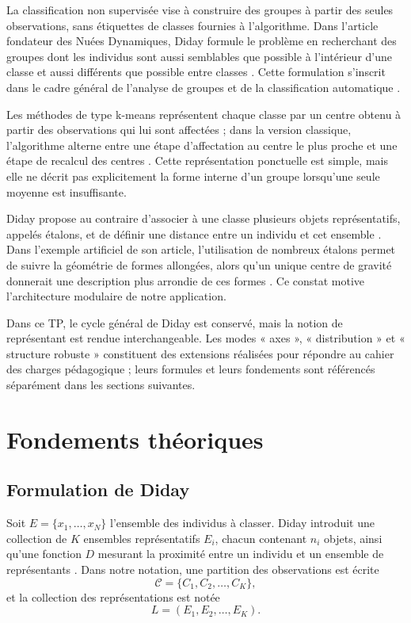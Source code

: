 \documentclass[12pt,a4paper]{article}
\begin{document}
La classification non supervisée vise à construire des groupes à partir des seules observations, sans étiquettes de classes fournies à l'algorithme. Dans l'article fondateur des Nuées Dynamiques, Diday formule le problème en recherchant des groupes dont les individus sont aussi semblables que possible à l'intérieur d'une classe et aussi différents que possible entre classes \cite[p.~20]{diday1971}. Cette formulation s'inscrit dans le cadre général de l'analyse de groupes et de la classification automatique \cite{kaufman1990}.

Les méthodes de type k-means représentent chaque classe par un centre obtenu à partir des observations qui lui sont affectées ; dans la version classique, l'algorithme alterne entre une étape d'affectation au centre le plus proche et une étape de recalcul des centres \cite{macqueen1967,lloyd1982}. Cette représentation ponctuelle est simple, mais elle ne décrit pas explicitement la forme interne d'un groupe lorsqu'une seule moyenne est insuffisante.

Diday propose au contraire d'associer à une classe plusieurs objets représentatifs, appelés étalons, et de définir une distance entre un individu et cet ensemble \cite[pp.~20--21]{diday1971}. Dans l'exemple artificiel de son article, l'utilisation de nombreux étalons permet de suivre la géométrie de formes allongées, alors qu'un unique centre de gravité donnerait une description plus arrondie de ces formes \cite[p.~25]{diday1971}. Ce constat motive l'architecture modulaire de notre application.

Dans ce TP, le cycle général de Diday est conservé, mais la notion de représentant est rendue interchangeable. Les modes « axes », « distribution » et « structure robuste » constituent des extensions réalisées pour répondre au cahier des charges pédagogique ; leurs formules et leurs fondements sont référencés séparément dans les sections suivantes.

\section{Fondements théoriques}

\subsection{Formulation de Diday}

Soit $E=\{x_1,\ldots,x_N\}$ l'ensemble des individus à classer. Diday introduit une collection de $K$ ensembles représentatifs $E_i$, chacun contenant $n_i$ objets, ainsi qu'une fonction $D$ mesurant la proximité entre un individu et un ensemble de représentants \cite[p.~20]{diday1971}. Dans notre notation, une partition des observations est écrite
\[
\mathcal{C}=\{C_1,C_2,\ldots,C_K\},
\]
et la collection des représentations est notée
\[
L=(E_1,E_2,\ldots,E_K).
\]
\end{document}
